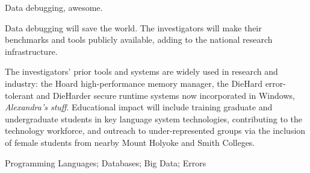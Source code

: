 \projectname{}


Data debugging, awesome.

\smallskip
{}  Data debugging will save the world.
The investigators will make their
benchmarks and tools publicly available, adding to the national
research infrastructure.

The investigators' prior tools and systems are widely used in research
and industry: the Hoard high-performance memory manager, the DieHard
error-tolerant and DieHarder secure runtime systems now incorporated
in Windows, \emph{Alexandra's stuff}. Educational impact will include
training graduate and undergraduate students in key language system
technologies, contributing to the technology workforce, and outreach
to under-represented groups via the inclusion of female students from
nearby Mount Holyoke and Smith Colleges.

\smallskip
{} Programming Languages; Databases; Big Data; Errors
